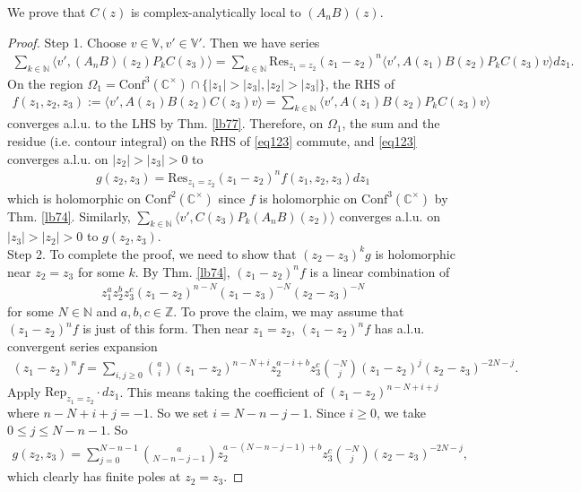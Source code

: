 \documentclass[11pt,b5paper,notitlepage]{article}
\theoremstyle{definition}
\theoremstyle{plain}
\newcommand{\Conf}{\mathrm{Conf}}
\newcommand{\Res}{\mathrm{Res}}
\newcommand{\Rep}{\mathrm{Rep}}
\newcommand{\bk}[1]{\langle {#1}\rangle}
\newcommand{\Vbb}{\mathbb V}
\newcommand{\Cbb}{\mathbb C}
\newcommand{\Nbb}{\mathbb N}
\newcommand{\Zbb}{\mathbb Z}
\numberwithin{equation}{section}
\begin{document}
We prove that $C(z)$ is complex-analytically local to $(A_nB)(z)$. 
\begin{proof}
Step 1. Choose $v\in\Vbb,v'\in\Vbb'$. Then we have series
\begin{align}
\sum_{k\in\Nbb}\bk{v',(A_nB)(z_2)P_kC(z_3)}=\sum_{k\in\Nbb}\Res_{z_1=z_2}(z_1-z_2)^n\bk{v',A(z_1)B(z_2)P_kC(z_3)v}dz_1.\label{eq123}
\end{align}
On the region  $\Omega_1=\Conf^3(\Cbb^\times)\cap\{|z_1|>|z_3|,|z_2|>|z_3|\}$, the RHS of
\begin{align*}
f(z_1,z_2,z_3):=\bk{v',A(z_1)B(z_2)C(z_3)v}=\sum_{k\in\Nbb}\bk{v',A(z_1)B(z_2)P_kC(z_3)v}	
\end{align*}
converges a.l.u. to the LHS by Thm. \ref{lb77}. Therefore, on $\Omega_1$, the sum and the residue (i.e. contour integral) on the RHS of \eqref{eq123} commute, and \eqref{eq123} converges a.l.u. on $|z_2|>|z_3|>0$ to
\begin{align*}
g(z_2,z_3)=\Res_{z_1=z_2}(z_1-z_2)^nf(z_1,z_2,z_3)dz_1	
\end{align*}
which is holomorphic on $\Conf^2(\Cbb^\times)$ since $f$ is holomorphic on $\Conf^3(\Cbb^\times)$ by Thm. \ref{lb74}. Similarly,  $\sum_{k\in\Nbb}\bk{v',C(z_3)P_k(A_nB)(z_2)}$ converges a.l.u. on $|z_3|>|z_2|>0$ to $g(z_2,z_3)$.\\

Step 2. To complete the proof, we need to show that $(z_2-z_3)^kg$ is holomorphic near $z_2=z_3$ for some $k$. By Thm. \ref{lb74}, $(z_1-z_2)^nf$ is a linear combination of
\begin{align*}
z_1^az_2^bz_3^c(z_1-z_2)^{n-N}(z_1-z_3)^{-N}(z_2-z_3)^{-N}	
\end{align*}
for some $N\in\Nbb$ and $a,b,c\in\Zbb$. To prove the claim, we may assume that $(z_1-z_2)^nf$ is just of this form. Then near $z_1=z_2$, $(z_1-z_2)^nf$ has a.l.u. convergent series expansion
\begin{align*}
(z_1-z_2)^nf=\sum_{i,j\geq0}{a\choose i}(z_1-z_2)^{n-N+i}z_2^{a-i+b}z_3^c{-N\choose j}(z_1-z_2)^j(z_2-z_3)^{-2N-j}.	
\end{align*}
Apply $\Rep_{z_1=z_2}\cdot dz_1$. This means taking the coefficient of $(z_1-z_2)^{n-N+i+j}$ where $n-N+i+j=-1$. So we set $i=N-n-j-1$. Since $i\geq0$, we take $0\leq j\leq N-n-1$. So
\begin{align*}
g(z_2,z_3)=\sum_{j=0}^{N-n-1}	{a\choose N-n-j-1}z_2^{a-(N-n-j-1)+b}z_3^c{-N\choose j}(z_2-z_3)^{-2N-j},
\end{align*}
which clearly has finite poles at $z_2=z_3$.
\end{proof}
\end{document}
